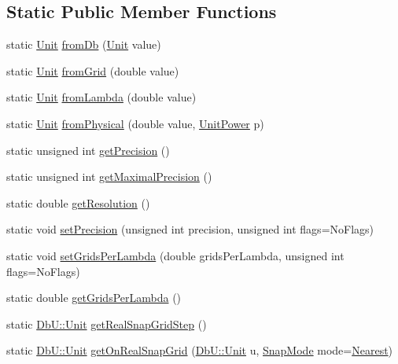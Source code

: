 \subsection*{Static Public Member Functions}
\begin{DoxyCompactItemize}
\item 
static \hyperlink{group__DbUGroup_ga4fbfa3e8c89347af76c9628ea06c4146}{Unit} \hyperlink{group__DbUGroup_gaec69d65ec1651c2feea24c5931f4580b}{from\+Db} (\hyperlink{group__DbUGroup_ga4fbfa3e8c89347af76c9628ea06c4146}{Unit} value)
\item 
static \hyperlink{group__DbUGroup_ga4fbfa3e8c89347af76c9628ea06c4146}{Unit} \hyperlink{group__DbUGroup_ga367e1d1b5ac1df076745550cba8a83c1}{from\+Grid} (double value)
\item 
static \hyperlink{group__DbUGroup_ga4fbfa3e8c89347af76c9628ea06c4146}{Unit} \hyperlink{group__DbUGroup_ga4b570755b19ea9ff0f2f258a221bd935}{from\+Lambda} (double value)
\item 
static \hyperlink{group__DbUGroup_ga4fbfa3e8c89347af76c9628ea06c4146}{Unit} \hyperlink{group__DbUGroup_ga11d4dbd9134a19bda35cbacde1cb2769}{from\+Physical} (double value, \hyperlink{group__DbUGroup_ga50b5785bf4d75026c4c112caec3040a7}{Unit\+Power} p)
\item 
static unsigned int \hyperlink{group__DbUGroup_ga6169efbdd9b3d54a0bd8467c8f957fda}{get\+Precision} ()
\item 
static unsigned int \hyperlink{group__DbUGroup_ga8756c9f0a32af5f601cd150e73b02c03}{get\+Maximal\+Precision} ()
\item 
static double \hyperlink{group__DbUGroup_ga120a60b09b344d01c583567a1e489d9e}{get\+Resolution} ()
\item 
static void \hyperlink{group__DbUGroup_gace9a8644e7e80dcaed2a8a95deeb1622}{set\+Precision} (unsigned int precision, unsigned int flags=No\+Flags)
\item 
static void \hyperlink{group__DbUGroup_gac93f9ba2a09105227e34bd05bcb1500c}{set\+Grids\+Per\+Lambda} (double grids\+Per\+Lambda, unsigned int flags=No\+Flags)
\item 
static double \hyperlink{group__DbUGroup_ga9a0359adbfafc356326f5c6adf57ff04}{get\+Grids\+Per\+Lambda} ()
\item 
static \hyperlink{group__DbUGroup_ga4fbfa3e8c89347af76c9628ea06c4146}{Db\+U\+::\+Unit} \hyperlink{group__DbUGroup_ga09e46fcca6aaca94851adfa196e10170}{get\+Real\+Snap\+Grid\+Step} ()
\item 
static \hyperlink{group__DbUGroup_ga4fbfa3e8c89347af76c9628ea06c4146}{Db\+U\+::\+Unit} \hyperlink{group__DbUGroup_ga8746e486f153aa37ee469c1604eba5c0}{get\+On\+Real\+Snap\+Grid} (\hyperlink{group__DbUGroup_ga4fbfa3e8c89347af76c9628ea06c4146}{Db\+U\+::\+Unit} u, \hyperlink{group__DbUGroup_ga1082168d6f9956ebba22ab8bbec21637}{Snap\+Mode} mode=\hyperlink{group__DbUGroup_gga1082168d6f9956ebba22ab8bbec21637a65e6f47eb16779b8974a80d6145a2db5}{Nearest})

\end{DoxyCompactItemize}
